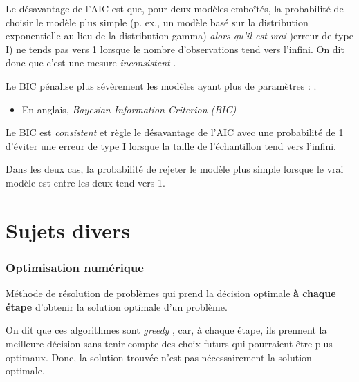 \documentclass[french]{article}
\begin{document}
\begin{multicols*}{2}
Le désavantage de l'AIC est que, pour deux modèles emboîtés, la probabilité de choisir le modèle plus simple (p. ex., un modèle basé sur la distribution exponentielle au lieu de la distribution gamma) \textit{alors qu'il est vrai} )erreur de type I) ne tends pas vers 1 lorsque le nombre d'observations tend vers l'infini. On dit donc que c'est une mesure \og \textit{inconsistent} \fg{}. 

\begin{definitionNOHFILLsub}
Le BIC pénalise plus sévèrement les modèles ayant plus de paramètres : .

\begin{itemize}
	\item	En anglais, \og \textit{Bayesian Information Criterion (BIC)} \fg{}
\end{itemize}
\end{definitionNOHFILLsub}

Le BIC est \og \textit{consistent} \fg{} et règle le désavantage de l'AIC avec une probabilité de 1 d'éviter une erreur de type I lorsque la taille de l'échantillon tend vers l'infini. 

\bigskip

Dans les deux cas, la probabilité de rejeter le modèle plus simple lorsque le vrai modèle est entre les deux tend vers 1. 





\newpage
\part{Sujets divers}
\label{chapt:varia}
\section{Optimisation numérique}
\begin{definitionNOHFILLsub}
Méthode de résolution de problèmes qui prend la décision optimale \textbf{à chaque étape} d'obtenir la solution optimale d'un problème.

\bigskip

On dit que ces algorithmes sont \og \textit{greedy} \fg{}, car, à chaque étape, ils prennent la meilleure décision sans tenir compte des choix futurs qui pourraient être plus optimaux. Donc, la solution trouvée n'est pas nécessairement la solution optimale.


\end{definitionNOHFILLsub}
\end{multicols*}
\end{document}
